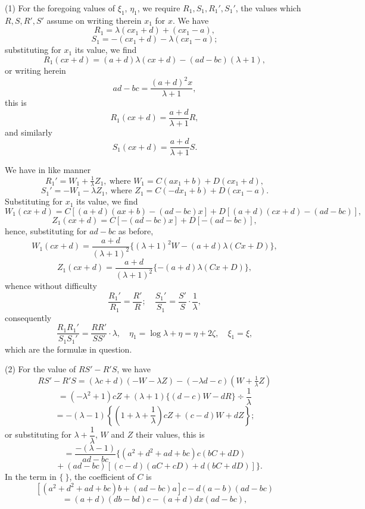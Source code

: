 \documentclass[11pt,a4paper]{article}
\begin{document}
\medskip

(1) For the foregoing values of $\xi_{1}$, $\eta_{1}$, we require $R_{1}, S_{1}, R_{1}', S_{1}'$, the values which $R, S, R', S'$ assume on writing therein $x_{1}$ for $x$. We have
\[
R_{1} = \lambda(cx_{1} + d) + (cx_{1} - a),
\]
\[
S_{1} = -(cx_{1} + d) - \lambda(cx_{1} - a);
\]
substituting for $x_{1}$ its value, we find
\[
R_{1}(cx + d) = (a + d)\lambda(cx + d) - (ad - bc)(\lambda + 1),
\]
or writing herein
\[
ad - bc = \frac{(a + d)^{2}x}{\lambda + 1},
\]
this is
\[
R_{1}(cx + d) = \frac{a + d}{\lambda + 1}R,
\]
and similarly
\[
S_{1}(cx + d) = \frac{a + d}{\lambda + 1}S.
\]

\newpage


We have in like manner
\[
R_{1}' = W_{1} + \tfrac{1}{\lambda}Z_{1},\ \text{where } W_{1} = C(ax_{1} + b) + D(cx_{1} + d),
\]
\[
S_{1}' = -W_{1} - \lambda Z_{1},\ \text{where } Z_{1} = C(-dx_{1} + b) + D(cx_{1} - a).
\]
Substituting for $x_{1}$ its value, we find
\[
W_{1}(cx + d) = C[(a + d)(ax + b) - (ad - bc)x] + D[(a + d)(cx + d) - (ad - bc)],
\]
\[
Z_{1}(cx + d) = C[-(ad - bc)x] + D[-(ad - bc)],
\]
hence, substituting for $ad - bc$ as before,
\[
W_{1}(cx + d) = \frac{a + d}{(\lambda + 1)^{2}}\{(\lambda + 1)^{2}W - (a + d)\lambda(Cx + D)\},
\]
\[
Z_{1}(cx + d) = \frac{a + d}{(\lambda + 1)^{2}}\{-(a + d)\lambda(Cx + D)\},
\]
whence without difficulty
\[
\frac{R_{1}'}{R_{1}} = \frac{R'}{R};\quad \frac{S_{1}'}{S_{1}} = \frac{S'}{S}\cdot\frac{1}{\lambda},
\]
consequently
\[
\frac{R_{1}R_{1}'}{S_{1}S_{1}'} = \frac{RR'}{SS'}\cdot\lambda,\quad \eta_{1} = \log\lambda + \eta = \eta + 2\zeta,\quad \xi_{1} = \xi,
\]
which are the formul\ae{} in question.

\medskip

(2) For the value of $RS' - R'S$, we have
\[
RS' - R'S = (\lambda c + d)(-W - \lambda Z) - (-\lambda d - c)(W + \tfrac{1}{\lambda}Z)
\]
\[
= (-\lambda^{2} + 1)cZ + (\lambda + 1)\{(d - c)W - dR\}\div\frac{1}{\lambda}
\]
\[
= -(\lambda - 1)\left\{\left(1 + \lambda + \frac{1}{\lambda}\right)cZ + (c - d)W + dZ\right\};
\]
or substituting for $\lambda + \dfrac{1}{\lambda}$, $W$ and $Z$ their values, this is
\[
= \frac{-(\lambda - 1)}{ad - bc}\{(a^{2} + d^{2} + ad + bc)c(bC + dD)
\]
\[
\quad + (ad - bc)[(c - d)(aC + cD) + d(bC + dD)]\}.
\]
In the term in $\{\ \}$, the coefficient of $C$ is
\[
[(a^{2} + d^{2} + ad + bc)b + (ad - bc)a]c - d(a - b)(ad - bc)
\]
\[
= (a + d)(db - bd)c - (a + d)dx(ad - bc),
\]
\end{document}
